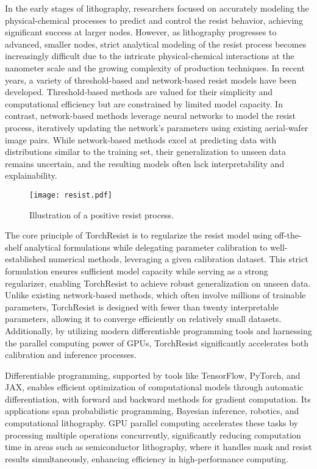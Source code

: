 In the early stages of lithography, researchers focused on accurately modeling the physical-chemical processes to predict and control the resist behavior, achieving significant success at larger nodes\cite{thackeray2013pursuit,smith2004lithographic}. However, as lithography progresses to advanced, smaller nodes, strict analytical modeling of the resist process becomes increasingly difficult due to the intricate physical-chemical interactions\cite{thackeray2007chemically} at the nanometer scale and the growing complexity of production techniques\cite{thackeray2011materials}. In recent years, a variety of threshold-based\cite{randall1999variable} and network-based resist models\cite{zach2004neural} have been developed. Threshold-based methods are valued for their simplicity and computational efficiency but are constrained by limited model capacity. In contrast, network-based methods leverage neural networks to model the resist process, iteratively updating the network's parameters using existing aerial-wafer image pairs. While network-based methods excel at predicting data with distributions similar to the training set, their generalization to unseen data remains uncertain, and the resulting models often lack interpretability and explainability.


\begin{figure}
    \centering
    \texttt{[image: resist.pdf]}
    \caption{Illustration of a positive resist process.}
    \label{fig:pipeline}
\end{figure}


The core principle of TorchResist is to regularize the resist model using off-the-shelf analytical formulations while delegating parameter calibration to well-established numerical methods, leveraging a given calibration dataset. This strict formulation ensures sufficient model capacity while serving as a strong regularizer, enabling TorchResist to achieve robust generalization on unseen data. Unlike existing network-based methods, which often involve millions of trainable parameters, TorchResist is designed with fewer than twenty interpretable parameters, allowing it to converge efficiently on relatively small datasets. Additionally, by utilizing modern differentiable programming tools and harnessing the parallel computing power of GPUs, TorchResist significantly accelerates both calibration and inference processes.





Differentiable programming, supported by tools like TensorFlow\cite{tensorflow2015-whitepaper}, PyTorch\cite{paszke2019pytorch}, and JAX\cite{jax2018github}, enables efficient optimization of computational models through automatic differentiation, with forward and backward methods for gradient computation. Its applications span probabilistic programming, Bayesian inference, robotics, and computational lithography. GPU parallel computing accelerates these tasks by processing multiple operations concurrently, significantly reducing computation time in areas such as semiconductor lithography, where it handles mask and resist results simultaneously, enhancing efficiency in high-performance computing.


